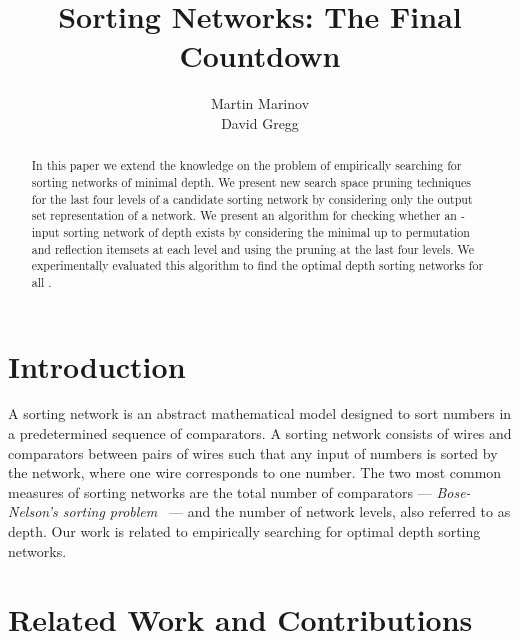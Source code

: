 \documentclass[13pt,a4paper]{article}
\begin{document}
\title{ Sorting Networks: The Final Countdown }
\author{Martin Marinov\\ David Gregg}
\maketitle









\begin{abstract}

In this paper we extend the knowledge on the problem of empirically searching for sorting networks of minimal depth. We present new search space pruning techniques for the last four levels of a candidate sorting network by considering only the output set representation of a network. We present an algorithm for checking whether an -input sorting network of depth  exists by considering the minimal up to permutation and reflection itemsets at each level and using the pruning at the last four levels. We experimentally evaluated this algorithm to find the optimal depth sorting networks for all .

\end{abstract}



\section{Introduction}









A sorting network is an abstract mathematical model designed to sort numbers in a predetermined sequence of comparators. A sorting network consists of  wires and comparators between pairs of wires such that any input of  numbers is sorted by the network, where one wire corresponds to one number. The two most common measures of sorting networks are the total number of comparators --- \emph{Bose-Nelson's sorting problem~\cite{Bose:1962:SP}} --- and the number of network levels, also referred to as depth. Our work is related to empirically searching for optimal depth sorting networks.


\section{Related Work and Contributions}
\end{document}
